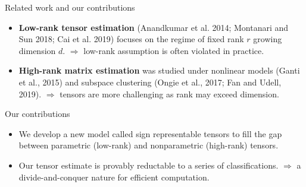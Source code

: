 \documentclass[10pt, mathserif]{beamer} %
\theoremstyle{definition}
\theoremstyle{plain}
\begin{document}
\begin{frame}{Related work and our contributions}


\begin{itemize}
\item {\bf Low-rank tensor estimation} (Anandkumar et al. 2014; Montanari and Sun 2018; Cai et al. 2019) focuses on the regime of fixed rank $r$ growing dimension $d$. $\Rightarrow$ {\color{red}low-rank assumption is often violated} in practice. 
\item {\bf High-rank matrix estimation} was studied under nonlinear models (Ganti et al., 2015) and subspace clustering (Ongie et al., 2017; Fan and Udell, 2019). $\Rightarrow$ tensors are more challenging as {\color{red}rank may exceed dimension}. 
\end{itemize}

\pause
\begin{block}{Our contributions}
\begin{itemize}
\item We develop a new model called {\color{red} sign representable tensors} to fill the gap between parametric (low-rank) and nonparametric (high-rank) tensors. 
\item Our tensor estimate is {\color{red}provably reductable} to a series of classifications. $\Rightarrow$ a divide-and-conquer nature for efficient computation. 
\end{itemize}
\end{block}
\end{frame}
\end{document}

